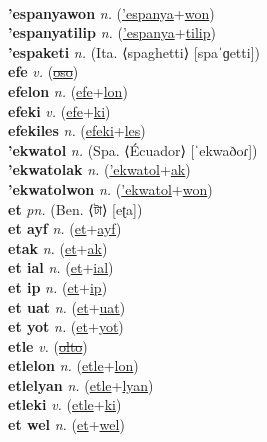  \label{'espanyaak} \\
\textbf{'espanyawon} \textit{n.} (\hyperref['espanya]{'espanya}+\hyperref[won]{won})
 \label{'espanyawon} \\
\textbf{'espanyatilip} \textit{n.} (\hyperref['espanya]{'espanya}+\hyperref[tilip]{tilip})
 \label{'espanyatilip} \\
\textbf{'espaketi} \textit{n.} (Ita. ⟨spaghetti⟩ [spaˈɡetti])
 \label{'espaketi} \\
\textbf{efe} \textit{v.} (\hyperref[oso]{\sout{oso}})
 \label{efe} \\
\textbf{efelon} \textit{n.} (\hyperref[efe]{efe}+\hyperref[lon]{lon})
 \label{efelon} \\
\textbf{efeki} \textit{v.} (\hyperref[efe]{efe}+\hyperref[ki]{ki})
 \label{efeki} \\
\textbf{efekiles} \textit{n.} (\hyperref[efeki]{efeki}+\hyperref[les]{les})
 \label{efekiles} \\
\textbf{'ekwatol} \textit{n.} (Spa. ⟨Écuador⟩ [ˈekwaðoɾ])
 \label{'ekwatol} \\
\textbf{'ekwatolak} \textit{n.} (\hyperref['ekwatol]{'ekwatol}+\hyperref[ak]{ak})
 \label{'ekwatolak} \\
\textbf{'ekwatolwon} \textit{n.} (\hyperref['ekwatol]{'ekwatol}+\hyperref[won]{won})
 \label{'ekwatolwon} \\
\textbf{et} \textit{pn.} (Ben. ⟨টা⟩ [eʈa])
 \label{et} \\
\textbf{et ayf} \textit{n.} (\hyperref[et]{et}+\hyperref[ayf]{ayf})
 \label{et ayf} \\
\textbf{etak} \textit{n.} (\hyperref[et]{et}+\hyperref[ak]{ak})
 \label{etak} \\
\textbf{et ial} \textit{n.} (\hyperref[et]{et}+\hyperref[ial]{ial})
 \label{et ial} \\
\textbf{et ip} \textit{n.} (\hyperref[et]{et}+\hyperref[ip]{ip})
 \label{et ip} \\
\textbf{et uat} \textit{n.} (\hyperref[et]{et}+\hyperref[uat]{uat})
 \label{et uat} \\
\textbf{et yot} \textit{n.} (\hyperref[et]{et}+\hyperref[yot]{yot})
 \label{et yot} \\
\textbf{etle} \textit{v.} (\hyperref[olto]{\sout{olto}})
 \label{etle} \\
\textbf{etlelon} \textit{n.} (\hyperref[etle]{etle}+\hyperref[lon]{lon})
 \label{etlelon} \\
\textbf{etlelyan} \textit{n.} (\hyperref[etle]{etle}+\hyperref[lyan]{lyan})
 \label{etlelyan} \\
\textbf{etleki} \textit{v.} (\hyperref[etle]{etle}+\hyperref[ki]{ki})
 \label{etleki} \\
\textbf{et wel} \textit{n.} (\hyperref[et]{et}+\hyperref[wel]{wel})
 \label{et wel} \\
